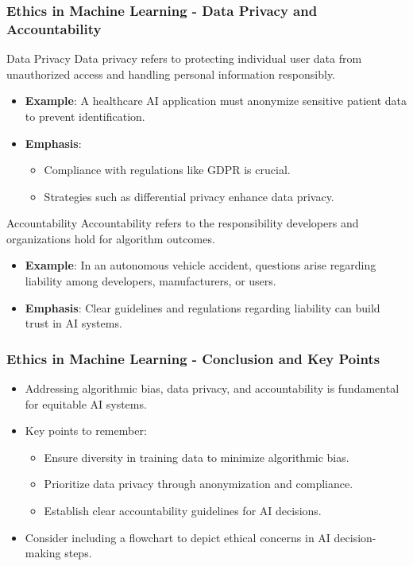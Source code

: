 \documentclass{beamer}
\begin{document}
\begin{frame}[fragile]
    \frametitle{Ethics in Machine Learning - Data Privacy and Accountability}
    \begin{block}{Data Privacy}
        Data privacy refers to protecting individual user data from unauthorized access and handling personal information responsibly.
    \end{block}
    \begin{itemize}
        \item \textbf{Example}: A healthcare AI application must anonymize sensitive patient data to prevent identification.
        \item \textbf{Emphasis}: 
        \begin{itemize}
            \item Compliance with regulations like GDPR is crucial.
            \item Strategies such as differential privacy enhance data privacy.
        \end{itemize}
    \end{itemize}
    
    \begin{block}{Accountability}
        Accountability refers to the responsibility developers and organizations hold for algorithm outcomes.
    \end{block}
    \begin{itemize}
        \item \textbf{Example}: In an autonomous vehicle accident, questions arise regarding liability among developers, manufacturers, or users.
        \item \textbf{Emphasis}: Clear guidelines and regulations regarding liability can build trust in AI systems.
    \end{itemize}
\end{frame}

\begin{frame}[fragile]
    \frametitle{Ethics in Machine Learning - Conclusion and Key Points}
    \begin{itemize}
        \item Addressing algorithmic bias, data privacy, and accountability is fundamental for equitable AI systems.
        \item Key points to remember:
        \begin{itemize}
            \item Ensure diversity in training data to minimize algorithmic bias.
            \item Prioritize data privacy through anonymization and compliance.
            \item Establish clear accountability guidelines for AI decisions.
        \end{itemize}
        \item Consider including a flowchart to depict ethical concerns in AI decision-making steps.
    \end{itemize}
\end{frame}
\end{document}
